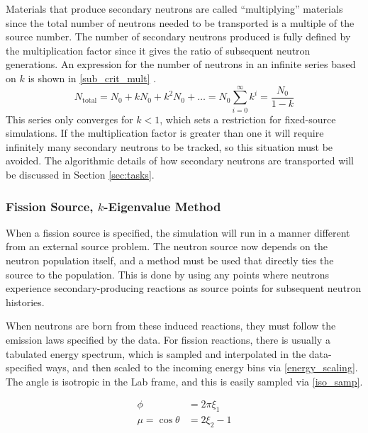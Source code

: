 Materials that produce secondary neutrons are called ``multiplying'' materials since the total number of neutrons needed to be transported is a multiple of the source number.  The number of secondary neutrons produced is fully defined by the multiplication factor since it gives the ratio of subsequent neutron generations.  An expression for the number of neutrons in an infinite series based on $k$ is shown in \eqref{sub_crit_mult} \cite{duderstadt}\cite{jaakko}.
%
\begin{equation}
\label{sub_crit_mult}
N_\mathrm{total} = N_0 + k N_0 + k^2 N_0 + \dots = N_0 \sum_{i=0}^\infty k^i = \frac{N_0}{1-k}
\end{equation}
%
This series only converges for $k<1$, which sets a restriction for fixed-source simulations.  If the multiplication factor is greater than one it will require infinitely many secondary neutrons to be tracked, so this situation must be avoided.  The algorithmic details of how secondary neutrons are transported will be discussed in Section \ref{sec:tasks}.

\subsubsection{Fission Source, $k$-Eigenvalue Method}

When a fission source is specified, the simulation will run in a manner different from an external source problem.  The neutron source now depends on the neutron population itself, and a method must be used that directly ties the source to the population.  This is done by using any points where neutrons experience secondary-producing reactions as source points for subsequent neutron histories.  

When neutrons are born from these induced reactions, they must follow the emission laws specified by the data.  For fission reactions, there is usually a tabulated energy spectrum, which is sampled and interpolated in the data-specified ways, and then scaled to the incoming energy bins via \eqref{energy_scaling}.  The angle is isotropic in the Lab frame, and this is easily sampled via \eqref{iso_samp}.

\begin{equation}
\label{iso_samp}
\begin{split}
\phi &= 2 \pi \xi_1 \\
\mu= \cos \theta &= 2 \xi_2 -1
\end{split}
\end{equation}


